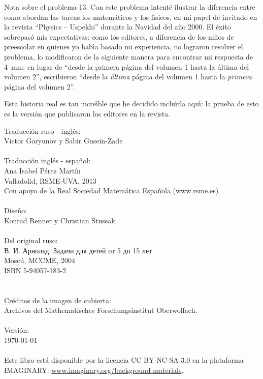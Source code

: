 \begin{note}{Nota sobre el problema 13.}
	Con este problema intent\'e ilustrar la diferencia entre como abordan las tareas los matem\'aticos y los f\'{\i}sicos, en mi papel de invitado en la revista \enquote{Physics -- Uspekhi}  durante la Navidad del a\~no 2000. El \'exito sobrepas\'o mis expectativas: como los editores, a diferencia de los ni\~nos de preescolar en quienes yo hab\'{\i}a basado mi experiencia, no lograron resolver el problema, lo modificaron de la siguiente manera para encontrar mi respuesta de \SI{4}{\mm}: en lugar de \enquote{desde la primera p\'agina del volumen 1 hasta la \'ultima del volumen 2},  escribieron \enquote{desde la {\em \'ultima\/} p\'agina del volumen 1 hasta la {\em primera\/} p\'agina del volumen 2}.

	Esta historia real es tan incre\'{\i}ble que he decidido inclu\'{\i}rla aqu\'{\i}: la prueba de esto es la versi\'on que publicaron los editores en la revista.  
\end{note}
\clearpage
\null\vfill
\noindent
Traducci\'on ruso - ingl\'es:\\
\null\quad Victor Goryunov y Sabir Gusein-Zade\\
\\
Traducci\'on ingl\'es - espa\~{n}ol:\\
\null\quad Ana Isabel P\'erez Mart\'in\\
\null\quad Valladolid, RSME-UVA, 2013\\
\null\quad Con apoyo de la Real Sociedad Matem\'atica Espa\~{n}ola (www.rsme.es)\\
\\
Diseño:\\
\null\quad Konrad Renner y Christian Stussak\\
\\
Del original ruso:\\
\null\quad \textrussian{В. И. Арнольд: Задачи для детей от 5 до 15 лет}\\
\null\quad Mosc\'u, MCCME, 2004\\
\null\quad ISBN 5-94057-183-2\\
\\
\\
Cr\'editos de la imagen de cubierta:\\
\null\quad Archivos del Mathematisches Forschungsinstitut Oberwolfach.\\
\\
Versión:\\
\null\quad \today\\
\\
Este libro est\'a disponible por la licencia CC BY-NC-SA 3.0 en la plataforma IMAGINARY: \href{http://www.imaginary.org/background-materials}{www.imaginary.org/background-materials}.

